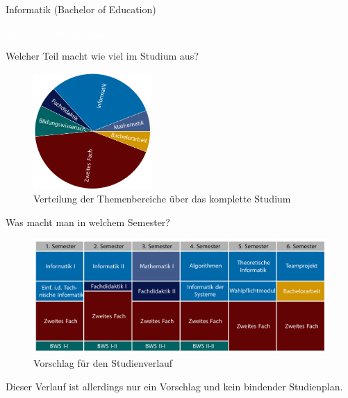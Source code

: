 	\begin{Huge}
			Informatik (Bachelor of Education)
		\end{Huge}
		\begin{exampleblock}{\textcolor{white}{Was ist der Studiengang?}}
			
		\end{exampleblock}
	
	\begin{block}{Welcher Teil macht wie viel im Studium aus?}
		\begin{figure}[h!]
			\includegraphics[width=0.4\textwidth]{charts/lehramt_informatik_piechartonly.pdf}
			\caption{Verteilung der Themenbereiche über das komplette Studium}
		\end{figure}
	\end{block}
	
	\begin{block}{Was macht man in welchem Semester?}
		\begin{figure}[h!]
			\includegraphics[width=\textwidth]{charts/lehramt_informatik_Studienplanonly.pdf}
			\caption{Vorschlag für den Studienverlauf}
		\end{figure}
		Dieser Verlauf ist allerdings nur ein Vorschlag und kein bindender Studienplan.
	\end{block}
